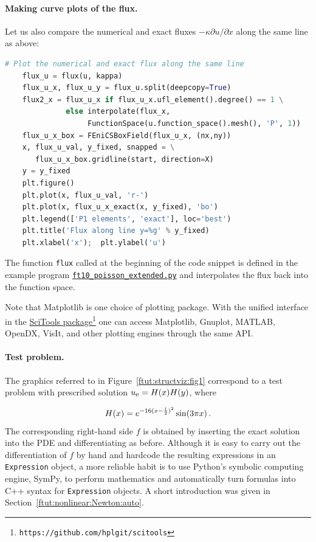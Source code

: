 \documentclass[graybox,envcountchap,sectrefs,final]{svmonodo}
\begin{document}
\paragraph{Making curve plots of the flux.}
Let us also compare the numerical and
exact fluxes $-\kappa\partial u/\partial x$ along the same line as above:

\begin{lstlisting}[language=Python,style=graycolor]
    # Plot the numerical and exact flux along the same line
    flux_u = flux(u, kappa)
    flux_u_x, flux_u_y = flux_u.split(deepcopy=True)
    flux2_x = flux_u_x if flux_u_x.ufl_element().degree() == 1 \
              else interpolate(flux_x,
                   FunctionSpace(u.function_space().mesh(), 'P', 1))
    flux_u_x_box = FEniCSBoxField(flux_u_x, (nx,ny))
    x, flux_u_val, y_fixed, snapped = \
       flux_u_x_box.gridline(start, direction=X)
    y = y_fixed
    plt.figure()
    plt.plot(x, flux_u_val, 'r-')
    plt.plot(x, flux_u_x_exact(x, y_fixed), 'bo')
    plt.legend(['P1 elements', 'exact'], loc='best')
    plt.title('Flux along line y=%g' % y_fixed)
    plt.xlabel('x');  plt.ylabel('u')
\end{lstlisting}

The function \texttt{flux} called at the beginning of the code snippet is
defined in the example program
\href{{https://fenicsproject.org/pub/tutorial/python/vol1/ft10_poisson_extended.py}}{\nolinkurl{ft10_poisson_extended.py}}
and interpolates the flux back into the function space.

Note that Matplotlib is one choice of plotting package. With the
unified interface in the \href{{https://github.com/hplgit/scitools}}{SciTools package}\footnote{\texttt{https://github.com/hplgit/scitools}} one can access Matplotlib,
Gnuplot, MATLAB, OpenDX, VisIt, and other plotting engines through the
same API.


\paragraph{Test problem.}
The graphics referred to in Figure~\ref{ftut:structviz:fig1} correspond to
a test problem with prescribed solution $\uex = H(x)H(y)$, where

\[ H(x) = e^{-16(x-\frac{1}{2})^2}\sin(3\pi x)\tp\]
The corresponding right-hand side $f$ is obtained by inserting the exact
solution into the PDE and differentiating as before.
Although it is easy to carry out the
differentiation of $f$ by hand and hardcode the resulting expressions
in an \texttt{Expression} object, a more reliable habit is to use Python's
symbolic computing engine, SymPy, to perform mathematics and
automatically turn formulas into C++ syntax for \texttt{Expression} objects.
A short introduction was given in
Section~\ref{ftut:nonlinear:Newton:auto}.
\end{document}
